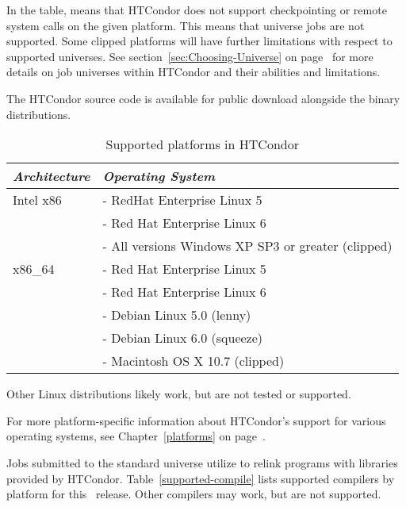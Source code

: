 In the table,  means that HTCondor does not support
checkpointing or remote system calls on the given platform. 
This means that  universe jobs are not supported.
Some clipped platforms will have further limitations with respect
to supported universes.
See section~\ref{sec:Choosing-Universe} on
page~\pageref{sec:Choosing-Universe} for more details on job universes
within HTCondor and their abilities and limitations.

The HTCondor source code is available for 
public download alongside the binary distributions.

\begin{center}
\begin{table}[hbt]
\begin{tabular}{|p{6cm}p{7cm}|} \hline
\emph{Architecture} & \emph{Operating System} \\ \hline \hline
Intel x86 & - RedHat Enterprise Linux 5 \\
 & - Red Hat Enterprise Linux 6 \\
 & - All versions Windows XP SP3 or greater (clipped) \\
x86\_64 & - Red Hat Enterprise Linux 5 \\ 
 & - Red Hat Enterprise Linux 6 \\
 & - Debian Linux 5.0 (lenny) \\
 & - Debian Linux 6.0 (squeeze) \\ \hline 
 & - Macintosh OS X 10.7 (clipped) \\ \hline
\end{tabular}
\caption{\label{table:supported-platforms}Supported platforms in HTCondor \VersionNotice}
\end{table}
\end{center}


\Note Other Linux distributions likely work, but are not tested
or supported.

For more platform-specific information about HTCondor's support for
various operating systems, see Chapter~\ref{platforms} on
page~\pageref{platforms}. 



Jobs submitted to the standard universe utilize 
to relink programs with libraries provided by HTCondor.
Table~\ref{supported-compile} lists supported compilers by
platform for this \VersionNotice\ release.
Other compilers may work, but are not supported.

